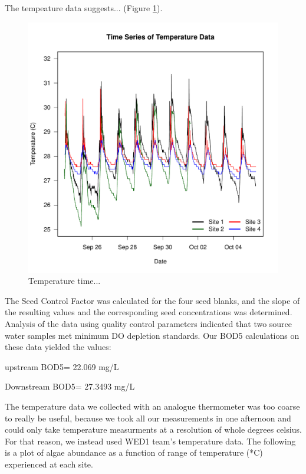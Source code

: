 \documentclass{article}\usepackage[]{graphicx}\usepackage[]{color}
\begin{document}
The tempeature data suggests... (Figure \ref{Temp}).

\begin{figure}
\includegraphics{Figures/Temp}
\caption{Temperature time...}
\label{Temp}
\end{figure}

The Seed Control Factor was calculated for the four seed blanks, and the slope of the resulting values and the corresponding seed concentrations was determined. Analysis of the data using quality control parameters indicated that two source water samples met minimum DO depletion standards. Our BOD5 calculations on these data yielded the values:

upstream BOD5= 22.069 mg/L 

Downstream BOD5= 27.3493 mg/L 

The temperature data we collected with an analogue thermometer was too coarse to really be useful, because we took all our measurements in one afternoon and could only take temperature measurments at a resolution of whole degrees celsius. For that reason, we instead used WED1 team's temperature data. The following is a plot of algae abundance as a function of range of temperature (*C) experienced at each site. 
\end{document}
